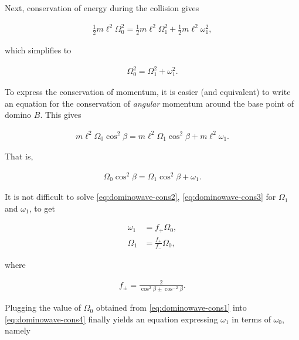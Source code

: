 \documentclass[11pt]{report}
\theoremstyle{plain}
\theoremstyle{definition}
\begin{document}
\noindent Next, conservation of energy during the collision
gives

\begin{align*}
\tfrac12 m\ell^2 \Omega_0^2 = \tfrac12 m\ell^2 \Omega_1^2 + \tfrac12m\ell^2 \omega_1^2,
\end{align*}

\noindent which simplifies to

\begin{equation*} \tag{26}\label{eq:dominowave-cons2}
\begin{split}
\Omega_0^2 = \Omega_1^2 + \omega_1^2.
\end{split}
\end{equation*}

\noindent To express the conservation of momentum, it is easier
(and equivalent) to write an equation for the
conservation of \emph{angular} momentum around the base
point of domino $B$. This gives

\begin{align*}
m\ell^2\Omega_0 \cos^2\beta = m\ell^2\Omega_1 \cos^2 \beta + m\ell^2\omega_1.
\end{align*}

\noindent That is,

\begin{equation*} \tag{27}\label{eq:dominowave-cons3}
\begin{split}
\Omega_0\cos^2\beta = \Omega_1\cos^2\beta + \omega_1.
\end{split}
\end{equation*}

\noindent It is not difficult to solve \eqref{eq:dominowave-cons2},
\eqref{eq:dominowave-cons3} for $\Omega_1$ and $\omega_1$,
to get

\begin{equation*} \tag{28}\label{eq:dominowave-cons4}
\begin{split}
\omega_1 &= f_+ \Omega_0, \\
\Omega_1 &= \frac{f_+}{f_-} \Omega_0,
\end{split}
\end{equation*}

\noindent where

\begin{align*}
f_{\pm} = \frac{2}{\cos^2 \beta \pm \cos^{-2}\beta}.
\end{align*}

\noindent Plugging the value of $\Omega_0$ obtained from
\eqref{eq:dominowave-cons1} into \eqref{eq:dominowave-cons4}
finally yields an equation expressing $\omega_1$ in
terms of $\omega_0$, namely
\end{document}
